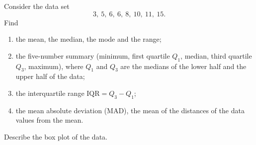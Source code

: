 Consider the data set
\[
3,\ 5,\ 6,\ 6,\ 8,\ 10,\ 11,\ 15 .
\]
Find
\begin{enumerate}
\item[(a)] the mean, the median, the mode and the range;
\item[(b)] the five-number summary (minimum, first quartile $Q_1$, median, third quartile $Q_3$, maximum), where $Q_1$ and $Q_3$ are the medians of the lower half and the upper half of the data;
\item[(c)] the interquartile range $\text{IQR}=Q_3-Q_1$;
\item[(d)] the mean absolute deviation (MAD), the mean of the distances of the data values from the mean.
\end{enumerate}
Describe the box plot of the data.
